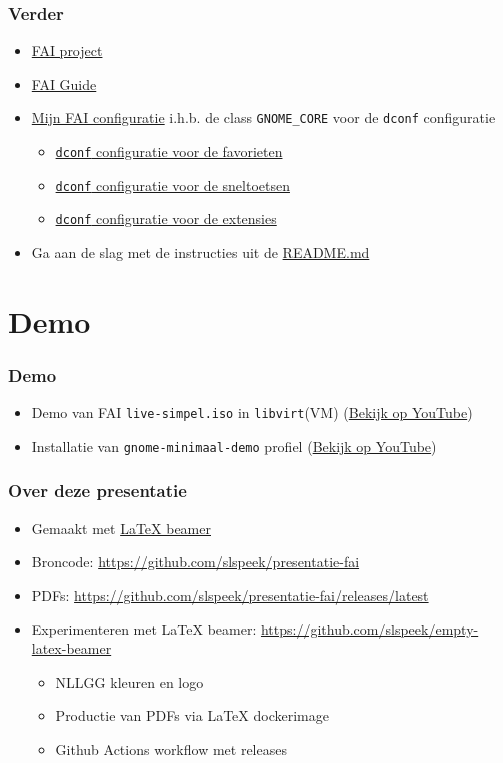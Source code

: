 \documentclass{beamer}
\newcommand{\reponame}{presentatie-fai}
\newcommand{\myfaiconfig}{https://github.com/slspeek/fai}
\newcommand{\myfaicmds}{https://github.com/slspeek/fai-cmds}
\begin{document}
\begin{frame}
\frametitle{Verder}
\begin{itemize}
  \item \href{https://fai-project.org/}{FAI project}
  \item \href{https://fai-project.org/fai-guide/}{FAI Guide}
  \item \href{\myfaiconfig/}{Mijn FAI configuratie} i.h.b. 
  de class \texttt{GNOME\_CORE} voor de \texttt{dconf} configuratie
  \begin{itemize}
    \item \href{\myfaiconfig/blob/main/files/etc/dconf/db/local.d/00-favorite-apps/DEVELOPER}{\texttt{dconf} configuratie voor de favorieten}
    \item \href{\myfaiconfig/blob/main/files/etc/dconf/db/local.d/10-shortcuts/GNOME_CORE}{\texttt{dconf} configuratie voor de sneltoetsen}
    \item \href{\myfaiconfig/blob/main/files/etc/dconf/db/local.d/40-gnome-extensions/GNOME_EXTENSIONS}{\texttt{dconf} configuratie voor de extensies}
  \end{itemize}
  \item Ga aan de slag met de instructies uit de \href{\myfaicmds/blob/main/README.md}{README.md}
\end{itemize}
\end{frame}

\section{Demo}
\begin{frame}
\frametitle{Demo}
\begin{itemize}
  \item Demo van FAI \texttt{live-simpel.iso} in \texttt{libvirt}(VM) (\href{https://youtu.be/4j1Wtoy2kK8}{Bekijk op YouTube})
  \item Installatie van \texttt{gnome-minimaal-demo} profiel (\href{https://youtu.be/CE_PjYTGtjc}{Bekijk op YouTube})
\end{itemize}
\end{frame}

\begin{frame}
\frametitle{Over deze presentatie}
\begin{itemize}
  \item Gemaakt met \href{https://nl.mirrors.cicku.me/ctan/macros/latex/contrib/beamer/doc/beameruserguide.pdf}{\LaTeX{} beamer}
  \item Broncode: \url{https://github.com/slspeek/\reponame}
  \item PDFs: \url{https://github.com/slspeek/\reponame/releases/latest}
  \item Experimenteren met \LaTeX{} beamer: \url{https://github.com/slspeek/empty-latex-beamer}
  \begin{itemize}
    \item NLLGG kleuren en logo
    \item Productie van PDFs via \LaTeX{} dockerimage
    \item Github Actions workflow met releases
  \end{itemize}
\end{itemize}
\end{frame}
\end{document}
